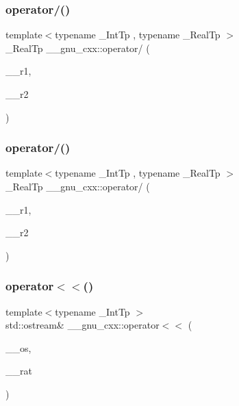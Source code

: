 \subsubsection{\texorpdfstring{operator/()}{operator/()}\hspace{0.1cm}{\footnotesize\ttfamily [2/3]}}
{\footnotesize\ttfamily template$<$typename \+\_\+\+Int\+Tp , typename \+\_\+\+Real\+Tp $>$ \\
\+\_\+\+Real\+Tp \+\_\+\+\_\+gnu\+\_\+cxx\+::operator/ (\begin{DoxyParamCaption}\item[{\+\_\+\+Real\+Tp}]{\+\_\+\+\_\+r1,  }\item[{const \hyperlink{class____gnu__cxx_1_1__Rational}{\+\_\+\+Rational}$<$ \+\_\+\+Int\+Tp $>$ \&}]{\+\_\+\+\_\+r2 }\end{DoxyParamCaption})}

\mbox{\label{namespace____gnu__cxx_a7ad2dbc41c8815732436adfc0e4f7b7f}} 
\subsubsection{\texorpdfstring{operator/()}{operator/()}\hspace{0.1cm}{\footnotesize\ttfamily [3/3]}}
{\footnotesize\ttfamily template$<$typename \+\_\+\+Int\+Tp , typename \+\_\+\+Real\+Tp $>$ \\
\+\_\+\+Real\+Tp \+\_\+\+\_\+gnu\+\_\+cxx\+::operator/ (\begin{DoxyParamCaption}\item[{const \hyperlink{class____gnu__cxx_1_1__Rational}{\+\_\+\+Rational}$<$ \+\_\+\+Int\+Tp $>$ \&}]{\+\_\+\+\_\+r1,  }\item[{\+\_\+\+Real\+Tp}]{\+\_\+\+\_\+r2 }\end{DoxyParamCaption})}

\mbox{\label{namespace____gnu__cxx_a51b459a56e08b4050d384a3436a650aa}} 
\subsubsection{\texorpdfstring{operator$<$$<$()}{operator<<()}}
{\footnotesize\ttfamily template$<$typename \+\_\+\+Int\+Tp $>$ \\
std\+::ostream\& \+\_\+\+\_\+gnu\+\_\+cxx\+::operator$<$$<$ (\begin{DoxyParamCaption}\item[{std\+::ostream \&}]{\+\_\+\+\_\+os,  }\item[{const \hyperlink{class____gnu__cxx_1_1__Rational}{\+\_\+\+Rational}$<$ \+\_\+\+Int\+Tp $>$ \&}]{\+\_\+\+\_\+rat }\end{DoxyParamCaption})}

